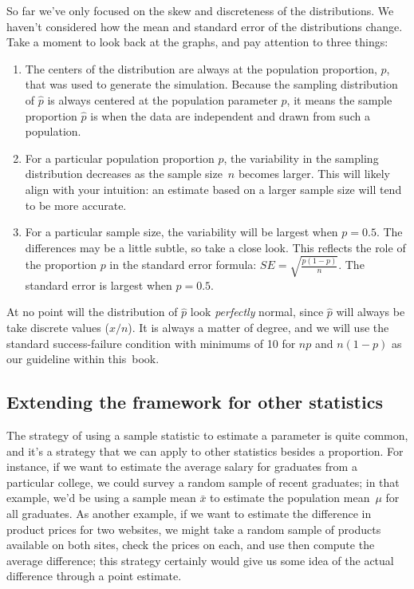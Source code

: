 So far we've only focused on the skew and discreteness
of the distributions.
We haven't considered how the mean and standard error
of the distributions change.
Take a moment to look back at the graphs,
and pay attention to three things:
\begin{enumerate}
\item The centers of the distribution are always at
    the population proportion, $p$, that was used to
    generate the simulation. Because the sampling
    distribution of $\hat{p}$ is always centered at
    the population parameter $p$, it means the sample
    proportion $\hat{p}$ is  when
    the data are independent and drawn from such
    a population.
\item For a particular population proportion $p$,
    the variability in the sampling distribution
    decreases as the sample size~$n$ becomes larger.
    This will likely align with your intuition:
    an estimate based on a larger sample size will
    tend to be more accurate.
\item For a particular sample size, the variability
    will be largest when $p = 0.5$. The differences
    may be a little subtle, so take a close look.
    This reflects the role of the proportion
    $p$ in the standard error formula:
    $SE = \sqrt{\frac{p (1 - p)}{n}}$.
    The standard error is largest when $p = 0.5$.
\end{enumerate}

At no point will the distribution of $\hat{p}$ look
\emph{perfectly} normal, since $\hat{p}$ will always
be take discrete values ($x / n$).
It is always a matter of degree, and we will use
the standard success-failure condition with minimums
of 10 for $np$ and $n (1 - p)$ as our guideline
within this~book.


\subsection{Extending the framework for other statistics}

The strategy of using a sample statistic to estimate
a parameter is quite common, and it's a strategy that
we can apply to other statistics besides a proportion.
For instance, if we want to estimate the average salary
for graduates from a particular college, we could
survey a random sample of recent graduates;
in that example, we'd be using a sample mean $\bar{x}$
to estimate the population mean~$\mu$ for all graduates.
As another example, if we want to estimate the
difference in product prices for two websites,
we might take a random sample of products available
on both sites, check the prices on each,
and use then compute the average difference;
this strategy certainly would give us some idea
of the actual difference through a point estimate.

